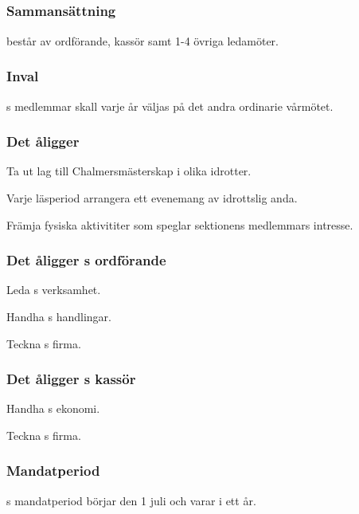 \subsection{\FRITIDFULL}
\subsubsection{Sammansättning}
\FRITID{} består av ordförande, kassör samt 1-4 övriga ledamöter.

\subsubsection{Inval}
\FRITID{}s medlemmar skall varje år väljas på det andra ordinarie vårmötet.

\subsubsection{Det åligger \FRITID}
\begin{att}
	\item Ta ut lag till Chalmersmästerskap i olika idrotter.
	\item Varje läsperiod arrangera ett evenemang av idrottslig anda.
	\item Främja fysiska aktivititer som speglar sektionens medlemmars intresse.
\end{att}

\subsubsection{Det åligger \FRITID{}s ordförande}
\begin{att}
	\item Leda \FRITID{}s verksamhet.
	\item Handha \FRITID{}s handlingar.
	\item Teckna \FRITID{}s firma.
\end{att}

\subsubsection{Det åligger \FRITID{}s kassör}
\begin{att}
	\item Handha \FRITID{}s ekonomi.
	\item Teckna \FRITID{}s firma.
\end{att}

\subsubsection{Mandatperiod}
\FRITID{}s mandatperiod börjar den 1 juli och varar i ett år.